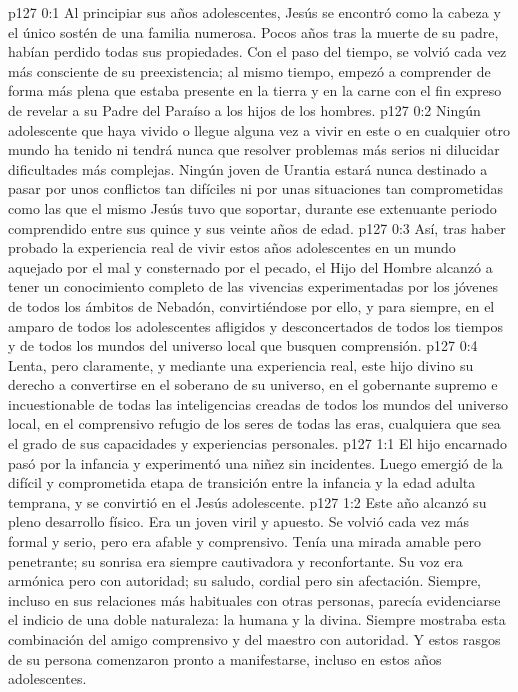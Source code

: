 \author{Comisión de seres intermedios}
\vs p127 0:1 Al principiar sus años adolescentes, Jesús se encontró como la cabeza y el único sostén de una familia numerosa. Pocos años tras la muerte de su padre, habían perdido todas sus propiedades. Con el paso del tiempo, se volvió cada vez más consciente de su preexistencia; al mismo tiempo, empezó a comprender de forma más plena que estaba presente en la tierra y en la carne con el fin expreso de revelar a su Padre del Paraíso a los hijos de los hombres.
\vs p127 0:2 Ningún adolescente que haya vivido o llegue alguna vez a vivir en este o en cualquier otro mundo ha tenido ni tendrá nunca que resolver problemas más serios ni dilucidar dificultades más complejas. Ningún joven de Urantia estará nunca destinado a pasar por unos conflictos tan difíciles ni por unas situaciones tan comprometidas como las que el mismo Jesús tuvo que soportar, durante ese extenuante periodo comprendido entre sus quince y sus veinte años de edad.
\vs p127 0:3 Así, tras haber probado la experiencia real de vivir estos años adolescentes en un mundo aquejado por el mal y consternado por el pecado, el Hijo del Hombre alcanzó a tener un conocimiento completo de las vivencias experimentadas por los jóvenes de todos los ámbitos de Nebadón, convirtiéndose por ello, y para siempre, en el amparo de todos los adolescentes afligidos y desconcertados de todos los tiempos y de todos los mundos del universo local que busquen comprensión.
\vs p127 0:4 Lenta, pero claramente, y mediante una experiencia real, este hijo divino  su derecho a convertirse en el soberano de su universo, en el gobernante supremo e incuestionable de todas las inteligencias creadas de todos los mundos del universo local, en el comprensivo refugio de los seres de todas las eras, cualquiera que sea el grado de sus capacidades y experiencias personales.
\vs p127 1:1 El hijo encarnado pasó por la infancia y experimentó una niñez sin incidentes. Luego emergió de la difícil y comprometida etapa de transición entre la infancia y la edad adulta temprana, y se convirtió en el Jesús adolescente.
\vs p127 1:2 Este año alcanzó su pleno desarrollo físico. Era un joven viril y apuesto. Se volvió cada vez más formal y serio, pero era afable y comprensivo. Tenía una mirada amable pero penetrante; su sonrisa era siempre cautivadora y reconfortante. Su voz era armónica pero con autoridad; su saludo, cordial pero sin afectación. Siempre, incluso en sus relaciones más habituales con otras personas, parecía evidenciarse el indicio de una doble naturaleza: la humana y la divina. Siempre mostraba esta combinación del amigo comprensivo y del maestro con autoridad. Y estos rasgos de su persona comenzaron pronto a manifestarse, incluso en estos años adolescentes.
